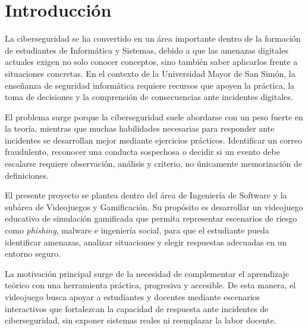\section{Introducción}

La ciberseguridad se ha convertido en un área importante dentro de la formación de estudiantes de Informática y Sistemas, debido a que las amenazas digitales actuales exigen no solo conocer conceptos, sino también saber aplicarlos frente a situaciones concretas. En el contexto de la Universidad Mayor de San Simón, la enseñanza de seguridad informática requiere recursos que apoyen la práctica, la toma de decisiones y la comprensión de consecuencias ante incidentes digitales.

El problema surge porque la ciberseguridad suele abordarse con un peso fuerte en la teoría, mientras que muchas habilidades necesarias para responder ante incidentes se desarrollan mejor mediante ejercicios prácticos. Identificar un correo fraudulento, reconocer una conducta sospechosa o decidir si un evento debe escalarse requiere observación, análisis y criterio, no únicamente memorización de definiciones.

El presente proyecto se plantea dentro del área de Ingeniería de Software y la subárea de Videojuegos y Gamificación. Su propósito es desarrollar un videojuego educativo de simulación gamificada que permita representar escenarios de riesgo como \textit{phishing}, malware e ingeniería social, para que el estudiante pueda identificar amenazas, analizar situaciones y elegir respuestas adecuadas en un entorno seguro.

La motivación principal surge de la necesidad de complementar el aprendizaje teórico con una herramienta práctica, progresiva y accesible. De esta manera, el videojuego busca apoyar a estudiantes y docentes mediante escenarios interactivos que fortalezcan la capacidad de respuesta ante incidentes de ciberseguridad, sin exponer sistemas reales ni reemplazar la labor docente.

